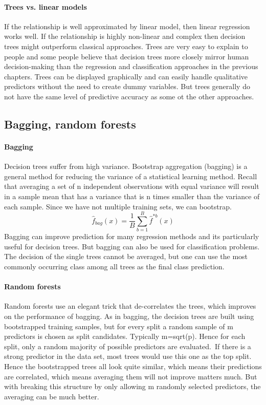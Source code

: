 \documentclass[../document.tex]{subfiles}
\begin{document}
	\paragraph{Trees vs. linear models}
	If the relationship is well approximated by linear model, then linear regression works well. If the relationship is highly non-linear and complex then decision trees might outperform classical approaches. Trees are very easy to explain to people and some people believe that decision trees more closely mirror human decision-making than the regression and classification approaches in the previous chapters. Trees can be displayed graphically and can easily handle qualitative predictors without the need to create dummy variables. But trees generally do not have the same level of predictive accuracy as some ot the other approaches.
	\subsection{Bagging, random forests}
	\paragraph{Bagging}
	Decision trees suffer from high variance. Bootstrap aggregation (bagging) is a general method for reducing the variance of a statistical learning method. Recall that averaging a set of n independent observations with equal variance will result in a sample mean that has a variance that is n times smaller than the variance of each sample.
	Since we have not multiple training sets, we can bootstrap.
	\begin{equation}
		\hat{f}_{bag}(x)=\frac{1}{B}\sum_{b=1}^{B}\hat{f}^{*b}(x)
	\end{equation}
	Bagging can improve prediction for many regression methods and its particularly useful for decision trees. But bagging can also be used for classification problems. The decision of the single trees cannot be averaged, but one can use the most commonly occurring class among all trees as the final class prediction.
	\paragraph{Random forests}
	Random forests use an elegant trick that de-correlates the trees, which improves on the performance of bagging. As in bagging, the decision trees are built using bootstrapped training samples, but for every split a random sample of m predictors is chosen as split candidates. Typically m=sqrt(p). Hence for each split, only a random majority of possible predictors are evaluated.\
	If there is a strong predictor in the data set, most trees would use this one as the top split. Hence the bootstrapped trees all look quite similar, which means their predictions are correlated, which means averaging them will not improve matters much. But with breaking this structure by only allowing m randomly selected predictors, the averaging can be much better.
\end{document}
